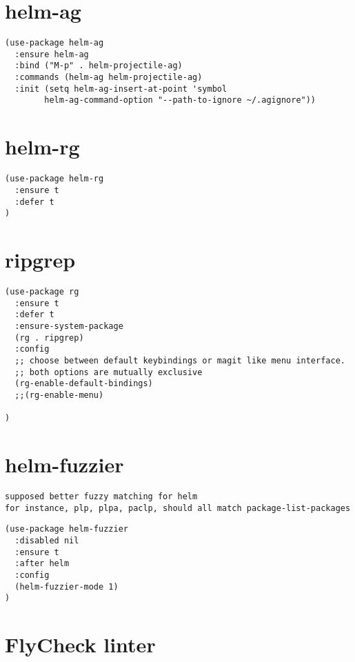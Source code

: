 \documentclass[11pt]{article}
\begin{document}
\section*{helm-ag}
\label{sec:org570535f}

\begin{verbatim}
(use-package helm-ag
  :ensure helm-ag
  :bind ("M-p" . helm-projectile-ag)
  :commands (helm-ag helm-projectile-ag)
  :init (setq helm-ag-insert-at-point 'symbol
        helm-ag-command-option "--path-to-ignore ~/.agignore"))
\end{verbatim}

\section*{helm-rg}
\label{sec:org88c42e4}

\begin{verbatim}
(use-package helm-rg
  :ensure t
  :defer t
)
\end{verbatim}

\section*{ripgrep}
\label{sec:org0fa1f23}

\begin{verbatim}
(use-package rg
  :ensure t
  :defer t
  :ensure-system-package
  (rg . ripgrep)
  :config
  ;; choose between default keybindings or magit like menu interface.
  ;; both options are mutually exclusive
  (rg-enable-default-bindings)
  ;;(rg-enable-menu)

)
\end{verbatim}

\section*{helm-fuzzier}
\label{sec:orga18c405}
\begin{verbatim}
supposed better fuzzy matching for helm
for instance, plp, plpa, paclp, should all match package-list-packages
\end{verbatim}



\begin{verbatim}
(use-package helm-fuzzier
  :disabled nil
  :ensure t
  :after helm
  :config
  (helm-fuzzier-mode 1)
)
\end{verbatim}

\section*{FlyCheck linter}
\label{sec:org9616451}
\end{document}
